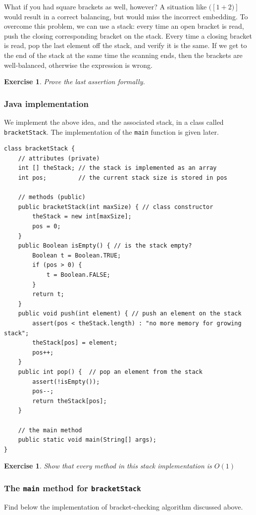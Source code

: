 \documentclass[a4paper]{book}
\theoremstyle{changebreak}                %
\newtheorem{ex}[result]{Exercise}
\begin{document}
What if you had square brackets as well, however? A situation like
$([1+2)]$ would result in a correct balancing, but would miss the
incorrect embedding. To overcome this problem, we can use a stack:
every time an open bracket is read, push the closing corresponding
bracket on the stack. Every time a closing bracket is read, pop the
last element off the stack, and verify it is the same.  If we get to
the end of the stack at the same time the scanning ends, then the
brackets are well-balanced, otherwise the expression is wrong.

\begin{ex}
Prove the last assertion formally.
\end{ex}

\subsubsection{Java implementation}
We implement the above idea, and the associated
stack, in a class called {\tt
  bracketStack}. The implementation of the {\tt main} function is
given later.  {\small
\begin{verbatim}
class bracketStack {
    // attributes (private)
    int [] theStack; // the stack is implemented as an array
    int pos;         // the current stack size is stored in pos

    // methods (public)
    public bracketStack(int maxSize) { // class constructor
        theStack = new int[maxSize];
        pos = 0;
    }
    public Boolean isEmpty() { // is the stack empty?
        Boolean t = Boolean.TRUE;
        if (pos > 0) {
            t = Boolean.FALSE;
        }
        return t;
    }
    public void push(int element) { // push an element on the stack
        assert(pos < theStack.length) : "no more memory for growing stack";
        theStack[pos] = element;
        pos++;
    }    
    public int pop() {  // pop an element from the stack
        assert(!isEmpty());
        pos--;
        return theStack[pos];
    }

    // the main method
    public static void main(String[] args);
}
\end{verbatim}
}

\begin{ex}
Show that every method in this stack implementation is $O(1)$
\end{ex}

\subsubsection{The {\tt main} method for {\tt bracketStack}}
Find below the implementation of bracket-checking algorithm discussed
above. 
\end{document}
